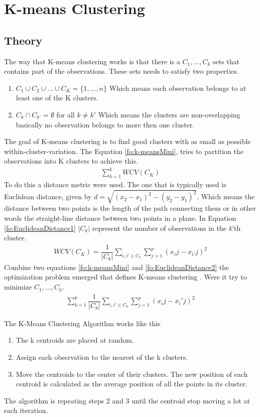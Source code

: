 \section{K-means Clustering}
\subsection{Theory}
The way that K-means clustering works is that there is a $C_1,...,C_k$ sets that contains part of the observations. These sets needs to satisfy two properties.
\begin{enumerate}
	\item $ C_1 \cup C_2 \cup ... \cup C_K = \{ 1,...,n \}$ Which means each observation belongs to at least one of the K clusters.
	\item $ C_k \cap C_{k'} = \emptyset $ for all $k \neq k'$ Which means the clusters are non-overlapping basically no observation belongs to more then one cluster.
\end{enumerate}

The goal of K-means clustering is to find good clusters with as small as possible within-cluster-variation. The Equation \ref{fo:k-meansMini}, tries to partition the observations into K clusters to achieve this.
\begin{align}\label{fo:k-meansMini}
\sum_{k=1}^{k} WCV(C_K)
\end{align}
To do this a distance metric were used. The one that is typically used is Euclidean distance, given by $d = \sqrt{ (x_2 - x_1)^2 - (y_2 - y_1)^2 } $. Which means the distance between two points is the length of the path connecting them or in other words the straight-line distance between two points in a plane. In Equation \ref{fo:EuclideanDistance1} $ |C_k| $ represent the number of observations in the \textit{k}'th cluster.
\begin{align}\label{fo:EuclideanDistance1}
WCV(C_K) = \dfrac{1}{|C_k|}  \sum_{i,i' \in C_k}   \sum_{j=1}^{p}(x_ij - x_{i'}j)^2
\end{align}
Combine two equations \ref{fo:k-meansMini} and \ref{fo:EuclideanDistance2} the optimization problem emerged that defines K-means clustering . Were it try to minimize $ C_1,...,C_k $.
\begin{align}\label{fo:EuclideanDistance2}
\sum_{k=1}^{k} \dfrac{1}{|C_k|}  \sum_{i,i' \in C_k}   \sum_{j=1}^{p}(x_ij - x_i'j)^2
\end{align}

The K-Means Clustering Algorithm works like this
\begin{enumerate}
	\item The k centroids are placed at random.
	\item Assign each observation to the nearest of the k clusters.
	\item Move the centroids to the center of their clusters. The new position of each centroid is calculated as the average position of all the points in its cluster.
\end{enumerate}
The algorithm  is repeating steps 2 and 3 until the centroid stop moving a lot at each iteration.

